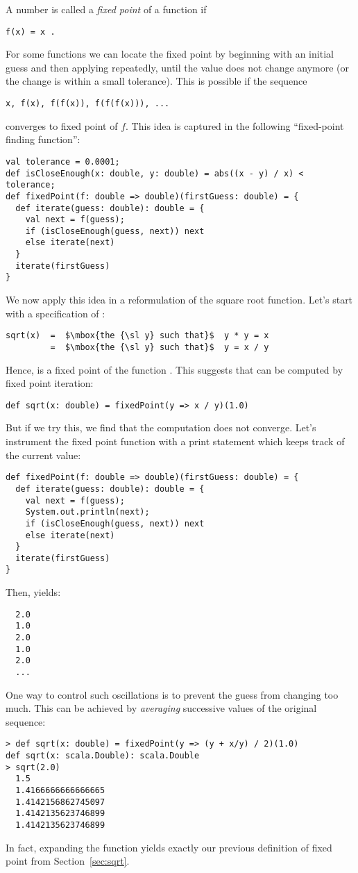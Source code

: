 A number  is called a {\em fixed point} of a function  if
\begin{lstlisting}
f(x) = x .
\end{lstlisting}
For some functions  we can locate the fixed point by beginning
with an initial guess and then applying  repeatedly, until the
value does not change anymore (or the change is within a small
tolerance). This is possible if the sequence
\begin{lstlisting}
x, f(x), f(f(x)), f(f(f(x))), ...
\end{lstlisting}
converges to fixed point of $f$. This idea is captured in
the following ``fixed-point finding function'':
\begin{lstlisting}
val tolerance = 0.0001;
def isCloseEnough(x: double, y: double) = abs((x - y) / x) < tolerance;
def fixedPoint(f: double => double)(firstGuess: double) = {
  def iterate(guess: double): double = {
    val next = f(guess);
    if (isCloseEnough(guess, next)) next
    else iterate(next)
  }
  iterate(firstGuess)
}
\end{lstlisting}
We now apply this idea in a reformulation of the square root function.
Let's start with a specification of :
\begin{lstlisting}
sqrt(x)  =  $\mbox{the {\sl y} such that}$  y * y = x
         =  $\mbox{the {\sl y} such that}$  y = x / y
\end{lstlisting}
Hence,  is a fixed point of the function .
This suggests that  can be computed by fixed point iteration:
\begin{lstlisting}
def sqrt(x: double) = fixedPoint(y => x / y)(1.0)
\end{lstlisting}
But if we try this, we find that the computation does not
converge. Let's instrument the fixed point function with a print
statement which keeps track of the current  value:
\begin{lstlisting}
def fixedPoint(f: double => double)(firstGuess: double) = {
  def iterate(guess: double): double = {
    val next = f(guess);
    System.out.println(next);
    if (isCloseEnough(guess, next)) next
    else iterate(next)
  }
  iterate(firstGuess)
}
\end{lstlisting}
Then,  yields:
\begin{lstlisting}
  2.0
  1.0
  2.0
  1.0
  2.0
  ...
\end{lstlisting}
One way to control such oscillations is to prevent the guess from changing too much. 
This can be achieved by {\em averaging} successive values of the original sequence:
\begin{lstlisting}
> def sqrt(x: double) = fixedPoint(y => (y + x/y) / 2)(1.0)
def sqrt(x: scala.Double): scala.Double
> sqrt(2.0)
  1.5
  1.4166666666666665
  1.4142156862745097
  1.4142135623746899
  1.4142135623746899
\end{lstlisting}
In fact, expanding the  function yields exactly our 
previous definition of fixed point from Section~\ref{sec:sqrt}.

